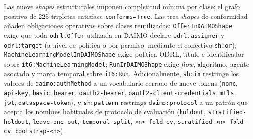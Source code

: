 \documentclass[Afour,sagev,times]{sagej}
\newcommand{\code}[1]{\texttt{#1}}
\begin{document}
Las nueve \emph{shapes} estructurales imponen completitud mínima por clase; el grafo positivo de 225 tripletas satisface \code{conforms=True}. Las tres \emph{shapes} de conformidad añaden obligaciones operativas sobre clases reutilizadas: \code{OfferInDAIMOShape} exige que toda \code{odrl:Offer} utilizada en DAIMO declare \code{odrl:assigner} y \code{odrl:target} (a nivel de política o por permiso, mediante el conectivo \code{sh:or}); \code{MachineLearningModelInDAIMOShape} exige política ODRL, título e identificador sobre \code{it6:MachineLearningModel}; \code{RunInDAIMOShape} exige \emph{flow}, algoritmo, agente asociado y marca temporal sobre \code{it6:Run}. Adicionalmente, \code{sh:in} restringe los valores de \code{daimo:authMethod} a un vocabulario cerrado de nueve tokens (\code{none}, \code{api-key}, \code{basic}, \code{bearer}, \code{oauth2-bearer}, \code{oauth2-client-credentials}, \code{mtls}, \code{jwt}, \code{dataspace-token}), y \code{sh:pattern} restringe \code{daimo:protocol} a un patrón que acepta los nombres habituales de protocolo de evaluación (\code{holdout}, \code{stratified-holdout}, \code{leave-one-out}, \code{temporal-split}, \code{<n>-fold-cv}, \code{stratified-<n>-fold-cv}, \code{bootstrap-<n>}).
\end{document}
